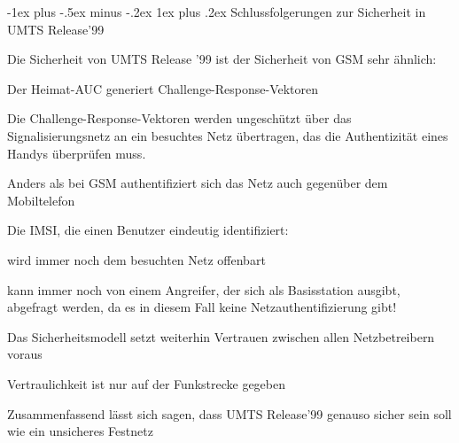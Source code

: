 \documentclass[a4paper]{article}
\makeatletter
\renewcommand{\subsubsection}{\@startsection{subsubsection}{3}{0mm}%
 {-1ex plus -.5ex minus -.2ex}%
 {1ex plus .2ex}%
 {\normalfont\small\bfseries}}
\makeatother
\begin{document}
\begin{multicols}{3}
      \subsubsection{Schlussfolgerungen zur Sicherheit in UMTS Release'99}
      \begin{itemize*}
            \item Die Sicherheit von UMTS Release '99 ist der Sicherheit von GSM sehr ähnlich:
            \begin{itemize*}
                  \item Der Heimat-AUC generiert Challenge-Response-Vektoren
                  \item Die Challenge-Response-Vektoren werden ungeschützt über das Signalisierungsnetz an ein besuchtes Netz übertragen, das die Authentizität eines Handys überprüfen muss.
                  \item Anders als bei GSM authentifiziert sich das Netz auch gegenüber dem Mobiltelefon
                  \item Die IMSI, die einen Benutzer eindeutig identifiziert:
                  \begin{itemize*}
                        \item wird immer noch dem besuchten Netz offenbart
                        \item kann immer noch von einem Angreifer, der sich als Basisstation ausgibt, abgefragt werden, da es in diesem Fall keine Netzauthentifizierung gibt!
                  \end{itemize*}
                  \item Das Sicherheitsmodell setzt weiterhin Vertrauen zwischen allen Netzbetreibern voraus
                  \item Vertraulichkeit ist nur auf der Funkstrecke gegeben
            \end{itemize*}
            \item Zusammenfassend lässt sich sagen, dass UMTS Release'99 genauso sicher sein soll wie ein unsicheres Festnetz
      \end{itemize*}


\end{multicols}
\end{document}
